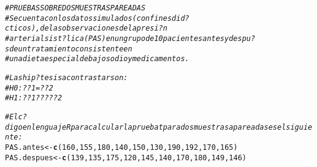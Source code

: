 \documentclass[10pt,a4paper]{article}\usepackage[]{graphicx}\usepackage[]{color}
\makeatletter
\newcommand{\hlnum}[1]{\textcolor[rgb]{0.686,0.059,0.569}{#1}}%
\newcommand{\hlcom}[1]{\textcolor[rgb]{0.678,0.584,0.686}{\textit{#1}}}%
\newcommand{\hlstd}[1]{\textcolor[rgb]{0.345,0.345,0.345}{#1}}%
\newcommand{\hlkwb}[1]{\textcolor[rgb]{0.69,0.353,0.396}{#1}}%
\newcommand{\hlkwd}[1]{\textcolor[rgb]{0.737,0.353,0.396}{\textbf{#1}}}%
\newenvironment{kframe}{%
 \def\at@end@of@kframe{}%
 \ifinner\ifhmode%
  \def\at@end@of@kframe{\end{minipage}}%
  \begin{minipage}{\columnwidth}%
 \fi\fi%
 \def\FrameCommand##1{\hskip\@totalleftmargin \hskip-\fboxsep
 \colorbox{shadecolor}{##1}\hskip-\fboxsep
     \hskip-\linewidth \hskip-\@totalleftmargin \hskip\columnwidth}%
 \MakeFramed {\advance\hsize-\width
   \@totalleftmargin\z@ \linewidth\hsize
   \@setminipage}}%
 {\par\unskip\endMakeFramed%
 \at@end@of@kframe}
\newenvironment{knitrout}{}{} %
\makeatother
\begin{document}
\begin{knitrout}
\begin{kframe}
\begin{alltt}
\hlcom{#PRUEBAS SOBRE DOS MUESTRAS PAREADAS }
\hlcom{#Se cuenta con los datos simulados (con fines did?cticos), de las observaciones de la presi?n }
\hlcom{#arterial sist?lica (PAS) en un grupo de 10 pacientes antes y despu?s de un tratamiento consistente en }
\hlcom{#una dieta especial de bajosodio y medicamentos.}

\hlcom{#Las hip?tesis a contrastar son:}
\hlcom{#H0:??1=??2}
\hlcom{#H1:??1?????2}

\hlcom{#El c?digo en lenguaje R para calcular la prueba t para dos muestras apareadas es el siguiente: }
\hlstd{PAS.antes} \hlkwb{<-} \hlkwd{c}\hlstd{(}\hlnum{160}\hlstd{,}\hlnum{155}\hlstd{,}\hlnum{180}\hlstd{,}\hlnum{140}\hlstd{,}\hlnum{150}\hlstd{,}\hlnum{130}\hlstd{,}\hlnum{190}\hlstd{,}\hlnum{192}\hlstd{,}\hlnum{170}\hlstd{,}\hlnum{165}\hlstd{)}
\hlstd{PAS.despues} \hlkwb{<-} \hlkwd{c}\hlstd{(}\hlnum{139}\hlstd{,}\hlnum{135}\hlstd{,}\hlnum{175}\hlstd{,}\hlnum{120}\hlstd{,}\hlnum{145}\hlstd{,}\hlnum{140}\hlstd{,}\hlnum{170}\hlstd{,}\hlnum{180}\hlstd{,}\hlnum{149}\hlstd{,}\hlnum{146}\hlstd{)}


\end{alltt}
\end{kframe}
\end{knitrout}
\end{document}
